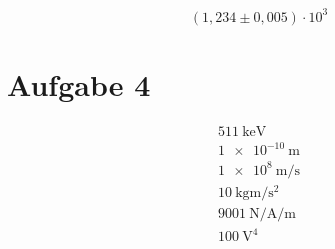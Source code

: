 \documentclass{scrartcl}
\begin{document}
\begin{equation}
  (1{,}234 \pm 0{,}005) \cdot 10^3
\end{equation}

\section*{Aufgabe 4}

\begin{gather}
  \SI{511}{\kilo\electronvolt} \\
  \SI{1e-10}{\metre} \\
  \SI{1e8}{\metre\per\second} \\
  \SI{10}{\kilo\gram\metre\per\square\second} \\
  \SI{9001}{\newton\per\ampere\per\metre} \\
  \SI{100}{\volt\tothe{4}}
\end{gather}
\end{document}
